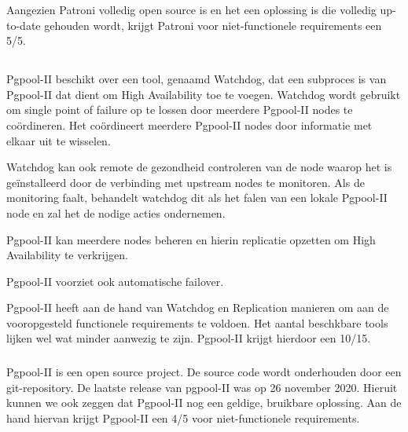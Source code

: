 Aangezien Patroni volledig open source is en het een oplossing is die volledig up-to-date gehouden wordt, krijgt Patroni voor niet-functionele requirements een 5/5.



\subsection{}
\label{subsec: Oplossing 2: Pgpool-II}

\subsubsection{}
\label{subsubsec:Functionele Requirements}

Pgpool-II beschikt over een tool, genaamd Watchdog, dat een subproces is van Pgpool-II dat dient om High Availability toe te voegen. Watchdog wordt gebruikt om single point of failure op te lossen door meerdere Pgpool-II nodes te coördineren. Het coördineert meerdere Pgpool-II nodes door informatie met elkaar uit te wisselen.

Watchdog kan ook remote de gezondheid controleren van de node waarop het is geïnstalleerd door de verbinding met upstream nodes te monitoren. Als de monitoring faalt, behandelt watchdog dit als het falen van een lokale Pgpool-II node en zal het de nodige acties ondernemen.

Pgpool-II kan meerdere nodes beheren en hierin replicatie opzetten om High Availability te verkrijgen.

Pgpool-II voorziet ook automatische failover.

Pgpool-II heeft aan de hand van Watchdog en Replication manieren om aan de vooropgesteld functionele requirements te voldoen. Het aantal beschkbare tools lijken wel wat minder aanwezig te zijn. Pgpool-II krijgt hierdoor een 10/15.

\subsubsection{}
\label{subsubsec:Niet-functionele Requirements}

Pgpool-II is een open source project. De source code wordt onderhouden door een git-repository.
De laatste release van pgpool-II was op 26 november 2020. Hieruit kunnen we ook zeggen dat Pgpool-II nog een geldige, bruikbare oplossing.
Aan de hand hiervan krijgt Pgpool-II een 4/5 voor niet-functionele requirements.

